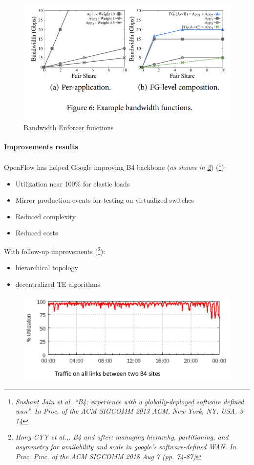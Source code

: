\documentclass[10pt,a4paper]{report}
\theoremstyle{definition}
\begin{document}
\begin{figure}[h!]
	\centering
	\includegraphics[scale=0.50]{images/Pasted image 20230330105706.png}
	\caption{Bandwidth Enforcer functions}
	\label{fig:traffic-enforcer-functions}
\end{figure}

\paragraph{Improvements results}\label{sec:improvements-results}
OpenFlow has helped Google improving B4 backbone (\textit{as shown in \ref{fig:b4-performance}}) (\footnote{\textit{Sushant Jain et al. “B4: experience with a globally-deployed software defined wan”. In Proc. of the ACM SIGCOMM 2013 ACM, New York, NY, USA, 3-14}}):
\begin{itemize}
	\item 
	Utilization near 100\% for elastic loads
	\item 
	Mirror production events for testing on virtualized switches
	\item 
	Reduced complexity
	\item 
	Reduced costs
\end{itemize}
	With follow-up improvements (\footnote{\textit{Hong CYY et al.,. B4 and after: managing hierarchy, partitioning, and asymmetry for availability and scale in google's software-defined WAN. In Proc. Proc. of the ACM SIGCOMM 2018 Aug 7 (pp. 74-87)}}):
\begin{itemize}

\item 
	hierarchical topology
	\item 
	decentralized TE algorithms


\end{itemize}
	\begin{figure}[h!]
	\centering
	\includegraphics[scale=0.50]{images/Pasted image 20230330105902.png}
	\caption{}
	\label{fig:b4-performance}	
\end{figure}
\end{document}
